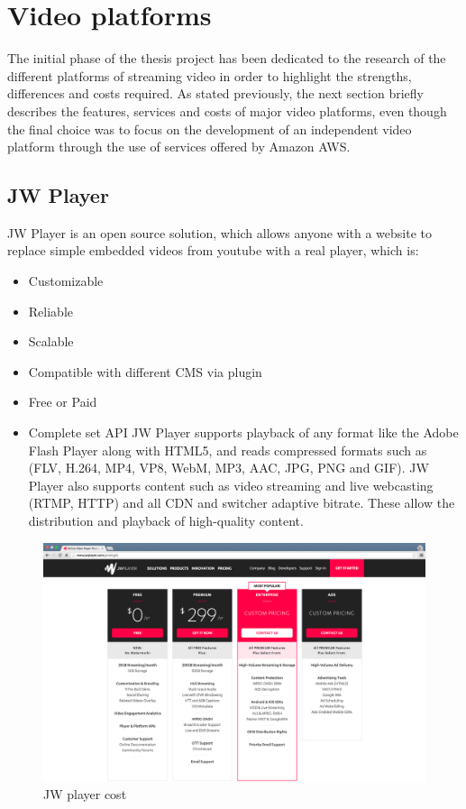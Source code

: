 \section{Video platforms}
\label{sec:Video platforms}

The initial phase of the thesis project has been dedicated to the research of the different platforms of streaming video in order to highlight the strengths, differences and costs required. As stated previously, the next section briefly describes the features, services and costs of major video platforms, even though the final choice was to focus on the development of an independent video platform through the use of services offered by Amazon AWS.

\subsection{JW Player}
\label{sec:JW Player}
 JW Player is an open source solution, which allows anyone with a website to replace simple embedded videos from youtube with a real player, which is:

\begin{itemize}
\item Customizable
\item Reliable
\item Scalable
\item Compatible with different CMS via plugin
\item Free or Paid
\item Complete set API
JW Player supports playback of any format like the Adobe Flash Player along with HTML5, and reads compressed formats such as (FLV, H.264, MP4, VP8, WebM, MP3, AAC, JPG, PNG and GIF). JW Player also  supports content such as video streaming and live webcasting (RTMP, HTTP) and all CDN and switcher adaptive bitrate. These allow the distribution and playback of high-quality content.
\end{itemize}


\begin{figure}[htb]
 \centering
 \includegraphics[width=1.0\linewidth]{images/chapter2/jwtPLayer.png}\hfill
 \caption[JW player cost]{JW player cost}
 \label{fig:fourV}
\end{figure}

